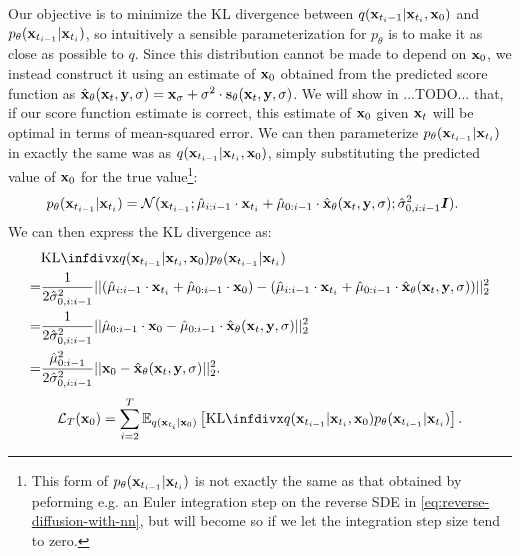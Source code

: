 Our objective is to minimize the KL divergence between $q({\mathbf{x}}_{t_i-1}|{\mathbf{x}}_{t_i},{\mathbf{x}}_0)$ and $p_\theta({\mathbf{x}}_{t_{i-1}}|{\mathbf{x}}_{t_i})$, so intuitively a sensible parameterization for $p_\theta$ is to make it as close as possible to $q$. Since this distribution cannot be made to depend on ${\mathbf{x}}_0$, we instead construct it using an estimate of ${\mathbf{x}}_0$ obtained from the predicted score function as $\hat{{\mathbf{x}}}_\theta({\mathbf{x}}_t, {\mathbf{y}}, \sigma) = {\mathbf{x}}_\sigma + \sigma^2 \cdot {\mathbf{s}}_\theta({\mathbf{x}}_t, {\mathbf{y}}, \sigma)$. 
We will show in ...TODO... that, if our score function estimate is correct, this estimate of ${\mathbf{x}}_0$ given ${\mathbf{x}}_t$ will be optimal in terms of mean-squared error.
We can then parameterize $p_\theta({\mathbf{x}}_{t_{i-1}} | {\mathbf{x}}_{t_i})$ in exactly the same was as $q({\mathbf{x}}_{t_{i-1}} | {\mathbf{x}}_{t_i},{\mathbf{x}}_0)$, simply substituting the predicted value of ${\mathbf{x}}_0$ for the true value\footnote{This form of $p_\theta({\mathbf{x}}_{t_{i-1}} | {\mathbf{x}}_{t_i})$ is not exactly the same as that obtained by peforming e.g. an Euler integration step on the reverse SDE in \cref{eq:reverse-diffusion-with-nn}, but will become so if we let the integration step size tend to zero. }:
\begin{align}
    p_\theta({\mathbf{x}}_{t_{i-1}} | {\mathbf{x}}_{t_i}) &= {\mathcal{N}}( {\mathbf{x}}_{t_{i-1}}; \hat{\mu}_{i:i-1} \cdot {\mathbf{x}}_{t_i} + \hat{\mu}_{0:i-1} \cdot \hat{{\mathbf{x}}}_\theta({\mathbf{x}}_t, {\mathbf{y}}, \sigma); \hat{\sigma}_{0,i:i-1}^2 {\bm{I}} ).
\end{align}
We can then express the KL divergence as:
\begin{align}
    &\kl{q(\rvx_{t_{i-1}} | \rvx_{t_i}, \rvx_0)}{p_\theta(\rvx_{t_{i-1}} | \rvx_{t_i})} \\ 
    = &\frac{1}{2 \hat{\sigma}_{0,i:i-1}^2} || (\hat{\mu}_{i:i-1} \cdot \rvx_{t_i} + \hat{\mu}_{0:i-1} \cdot \rvx_0) - (\hat{\mu}_{i:i-1} \cdot \rvx_{t_i} + \hat{\mu}_{0:i-1} \cdot \hat{\rvx}_\theta(\rvx_t, \rvy, \sigma)) ||_2^2 \\
    = &\frac{1}{2 \hat{\sigma}_{0,i:i-1}^2} || \hat{\mu}_{0:i-1} \cdot \rvx_0 - \hat{\mu}_{0:i-1} \cdot \hat{\rvx}_\theta(\rvx_t, \rvy, \sigma) ||_2^2 \\
    = &\frac{\hat{\mu}_{0:i-1}^2}{2 \hat{\sigma}_{0,i:i-1}^2} || \rvx_0 - \hat{\rvx}_\theta(\rvx_t, \rvy, \sigma) ||_2^2.
\end{align}
\begin{align}
    \mathcal{L}_T(\rvx_0) = \sum_{i=2}^T \EX_{q(\rvx_{t_i}|\rvx_0)} \left[ \kl{q(\rvx_{t_{i-1}} | \rvx_{t_i}, \rvx_0)}{p_\theta(\rvx_{t_{i-1}} | \rvx_{t_i})} \right].
\end{align}
